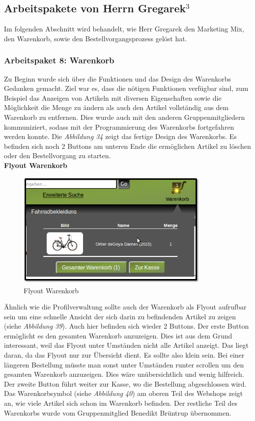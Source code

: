 \newpage
\subsection{Arbeitspakete von Herrn Gregarek$^3$}
Im folgenden Abschnitt wird behandelt, wie Herr Gregarek den Marketing Mix, den Warenkorb, sowie den Bestellvorgangsprozess gelöst hat.

\subsubsection{Arbeitspaket 8: Warenkorb}
Zu Beginn wurde sich über die Funktionen und das Design des Warenkorbs Gedanken gemacht. Ziel war es, dass die nötigen Funktionen verfügbar sind, zum Beispiel das Anzeigen von Artikeln mit diversen Eigenschaften sowie die Möglichkeit die Menge zu ändern als auch den Artikel vollständig aus dem Warenkorb zu entfernen. Dies wurde auch mit den anderen Gruppenmitgliedern kommuniziert, sodass mit der Programmierung des Warenkorbs fortgefahren werden konnte. Die \textit{Abbildung 34} zeigt das fertige Design des Warenkorbs. Es befinden sich noch 2 Buttons am unteren Ende die ermöglichen Artikel zu löschen oder den Bestellvorgang zu starten.\\

\textbf{Flyout Warenkorb}\\
\begin{figure}[H]
	\begin{center}
			\includegraphics[width=95mm]{Bilder/warenkorb_flyout.png}
	\end{center}
	\caption{Flyout Warenkorb}
\end{figure}

Ähnlich wie die Profilverwaltung sollte auch der Warenkorb als Flyout aufrufbar sein um eine schnelle Ansicht der sich darin zu befindenden Artikel zu zeigen (siehe \textit{Abbildung 39}). Auch hier befinden sich wieder 2 Buttons. Der erste Button ermöglicht es den gesamten Warenkorb anzuzeigen. Dies ist aus dem Grund interessant, weil das Flyout unter Umständen nicht alle Artikel anzeigt. Das liegt daran, da das Flyout nur zur Übersicht dient. Es sollte also klein sein. Bei einer längeren Bestellung müsste man sonst unter Umständen runter scrollen um den gesamten Warenkorb anzuzeigen. Dies wäre unübersichtlich und wenig hilfreich. Der zweite Button führt weiter zur Kasse, wo die Bestellung abgeschlossen wird. Das Warenkorbsymbol  (siehe \textit{Abbildung 40}) am oberen Teil des Webshops zeigt an, wie viele Artikel sich schon im Warenkorb befinden. Der restliche Teil des Warenkorbs wurde vom Gruppenmitglied Benedikt Brüntrup übernommen.


